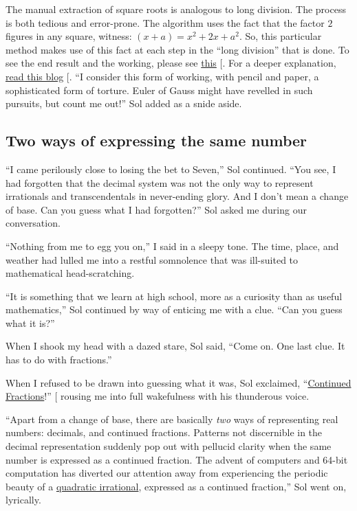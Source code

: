\documentclass[
  a4paper,
]{article}
\begin{document}
The manual extraction of square roots is analogous to long division. The
process is both tedious and error-prone. The algorithm uses the fact
that the factor \(2\) figures in any square, witness:
\((x + a) = x^2 + 2x +a^2\). So, this particular method makes use of
this fact at each step in the ``long division'' that is done. To see the
end result and the working, please see
\href{https://www.cuemath.com/algebra/square-root-of-2/}{this}
{[}\citeproc{ref-cuemathsqrt}{3}{]}. For a deeper explanation,
\href{https://www.cantorsparadise.com/the-square-root-algorithm-f97ab5c29d6d}{read
this blog} {[}\citeproc{ref-ujjwalsingh2021}{4}{]}. ``I consider this
form of working, with pencil and paper, a sophisticated form of torture.
Euler of Gauss might have revelled in such pursuits, but count me out!''
Sol added as a snide aside.

\subsection{Two ways of expressing the same
number}\label{two-ways-of-expressing-the-same-number}

``I came perilously close to losing the bet to Seven,'' Sol continued.
``You see, I had forgotten that the decimal system was not the only way
to represent irrationals and transcendentals in never-ending glory. And
I don't mean a change of base. Can you guess what I had forgotten?'' Sol
asked me during our conversation.

``Nothing from me to egg you on,'' I said in a sleepy tone. The time,
place, and weather had lulled me into a restful somnolence that was
ill-suited to mathematical head-scratching.

``It is something that we learn at high school, more as a curiosity than
as useful mathematics,'' Sol continued by way of enticing me with a
clue. ``Can you guess what it is?''

When I shook my head with a dazed stare, Sol said, ``Come on. One last
clue. It has to do with fractions.''

When I refused to be drawn into guessing what it was, Sol exclaimed,
``\href{https://en.wikipedia.org/wiki/Continued_fraction}{Continued
Fractions}!'' {[}\citeproc{ref-loya2017}{9}{]} rousing me into full
wakefulness with his thunderous voice.

``Apart from a change of base, there are basically \emph{two} ways of
representing real numbers: decimals, and continued fractions. Patterns
not discernible in the decimal representation suddenly pop out with
pellucid clarity when the same number is expressed as a continued
fraction. The advent of computers and 64-bit computation has diverted
our attention away from experiencing the periodic beauty of a
\href{https://en.wikipedia.org/wiki/Quadratic_irrational_number}{quadratic
irrational}, expressed as a continued fraction,'' Sol went on,
lyrically.
\end{document}
